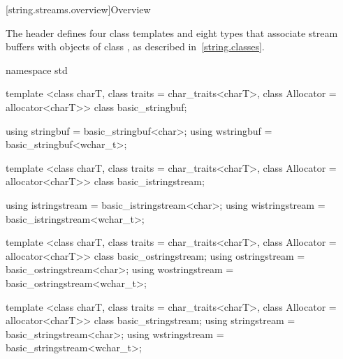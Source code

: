 [string.streams.overview]{Overview}

\pnum
The header
defines four
class templates
and eight types that associate stream buffers with objects of class
,
%
as described in~\ref{string.classes}.

%

%
%
%
%
%
%
%
%
%
%
%
%
%
%
%
%
\begin{codeblock}
namespace std {
  template <class charT, class traits = char_traits<charT>,
            class Allocator = allocator<charT>>
    class basic_stringbuf;

  using stringbuf  = basic_stringbuf<char>;
  using wstringbuf = basic_stringbuf<wchar_t>;

  template <class charT, class traits = char_traits<charT>,
            class Allocator = allocator<charT>>
    class basic_istringstream;

  using istringstream  = basic_istringstream<char>;
  using wistringstream = basic_istringstream<wchar_t>;

  template <class charT, class traits = char_traits<charT>,
            class Allocator = allocator<charT>>
    class basic_ostringstream;
  using ostringstream  = basic_ostringstream<char>;
  using wostringstream = basic_ostringstream<wchar_t>;

  template <class charT, class traits = char_traits<charT>,
            class Allocator = allocator<charT>>
    class basic_stringstream;
  using stringstream  = basic_stringstream<char>;
  using wstringstream = basic_stringstream<wchar_t>;
}
\end{codeblock}

